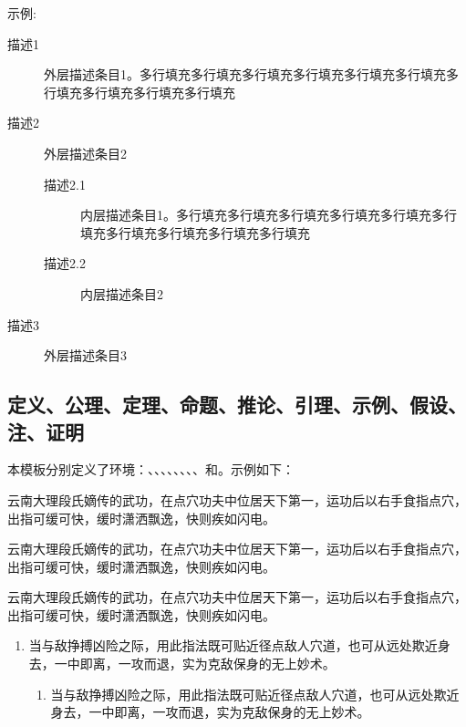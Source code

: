 \documentclass[QingNianC, vlined, timesmathnogreek]{nsfc}
\begin{document}
	\null

	示例:

	\begin{description}
		\item[描述1] 外层描述条目1。多行填充多行填充多行填充多行填充多行填充多行填充多行填充多行填充多行填充多行填充
		\item[描述2] 外层描述条目2
		\begin{description}
			\item[描述2.1] 内层描述条目1。多行填充多行填充多行填充多行填充多行填充多行填充多行填充多行填充多行填充多行填充
			\item[描述2.2] 内层描述条目2
		\end{description}
		\item[描述3] 外层描述条目3
	\end{description}
	
	\clearpage
	\subsection{定义、公理、定理、命题、推论、引理、示例、假设、注、证明}
	
	本模板分别定义了环境：、、、、、、、、和。示例如下：

	\begin{definition}[具体名称]
		云南大理段氏嫡传的武功，在点穴功夫中位居天下第一，运功后以右手食指点穴，出指可缓可快，缓时潇洒飘逸，快则疾如闪电。
	\end{definition}

	\begin{axiom}[具体名称]
		云南大理段氏嫡传的武功，在点穴功夫中位居天下第一，运功后以右手食指点穴，出指可缓可快，缓时潇洒飘逸，快则疾如闪电。
	\end{axiom}
	
	\begin{theorem}[具体名称]
		云南大理段氏嫡传的武功，在点穴功夫中位居天下第一，运功后以右手食指点穴，出指可缓可快，缓时潇洒飘逸，快则疾如闪电。

		\begin{enumerate}
			\item 当与敌挣搏凶险之际，用此指法既可贴近径点敌人穴道，也可从远处欺近身去，一中即离，一攻而退，实为克敌保身的无上妙术。
			\begin{enumerate}
				\item 当与敌挣搏凶险之际，用此指法既可贴近径点敌人穴道，也可从远处欺近身去，一中即离，一攻而退，实为克敌保身的无上妙术。
			\end{enumerate}
		\end{enumerate}
	\end{theorem}
	
\end{document}
